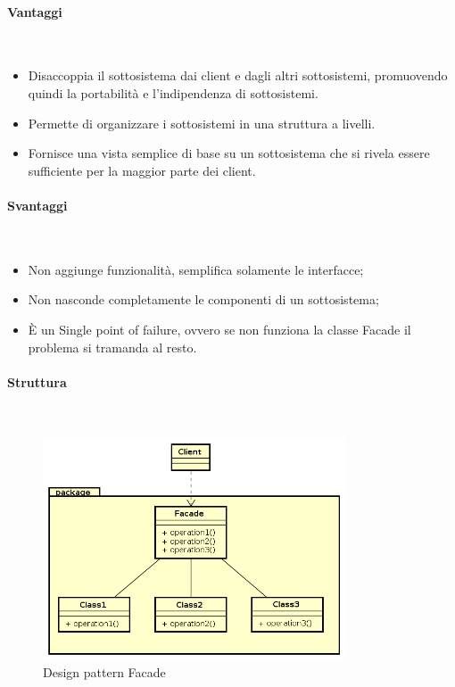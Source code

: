 \paragraph{Vantaggi} \mbox{} \\
\begin{itemize}
\item Disaccoppia il sottosistema dai client e dagli altri sottosistemi, promuovendo quindi la portabilità e l'indipendenza di sottosistemi.
\item Permette di organizzare i sottosistemi in una struttura a livelli.
\item Fornisce una vista semplice di base su un sottosistema che si rivela essere sufficiente per la maggior parte dei client.
\end{itemize}
\paragraph{Svantaggi} \mbox{} \\
\begin{itemize}
\item Non aggiunge funzionalità, semplifica solamente le interfacce;
\item Non nasconde completamente le componenti di un sottosistema;
\item È un Single point of failure, ovvero se non funziona la classe Facade il problema si tramanda al resto.
\end{itemize}
\paragraph{Struttura} \mbox{} \\
\begin{figure}[H]
\centering
\includegraphics[width=0.8\textwidth]{res/sections/backend/facade.png}
\caption{Design pattern Facade}
\end{figure}
